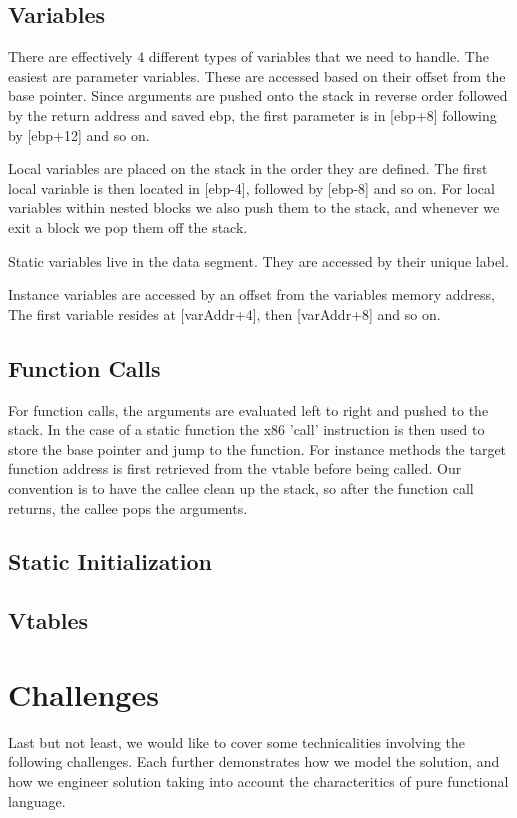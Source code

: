 \documentclass[12pt,letterpaper]{article}
\begin{document}
\subsection{Variables}
There are effectively 4 different types of variables that we need to handle.
The easiest are parameter variables. These are accessed based on their offset from the base pointer.
Since arguments are pushed onto the stack in reverse order followed by the return address and saved ebp, the first parameter is in [ebp+8] following by [ebp+12] and so on.

Local variables are placed on the stack in the order they are defined. The first local variable is then located in [ebp-4], followed by [ebp-8] and so on.
For local variables within nested blocks we also push them to the stack, and whenever we exit a block we pop them off the stack.

Static variables live in the data segment. They are accessed by their unique label.

Instance variables are accessed by an offset from the variables memory address, The first variable resides at [varAddr+4], then [varAddr+8] and so on.

\subsection{Function Calls}
For function calls, the arguments are evaluated left to right and pushed to the stack.
In the case of a static function the x86 'call' instruction is then used to store the base pointer and jump to the function.
For instance methods the target function address is first retrieved from the vtable before being called.
Our convention is to have the callee clean up the stack, so after the function call returns, the callee pops the arguments.

\subsection{Static Initialization}

\subsection{Vtables}

\section{Challenges}
Last but not least, we would like to cover some technicalities involving the following challenges. Each further demonstrates how we model the solution, and how we engineer solution taking into account the characteritics of pure functional language.
\end{document}
